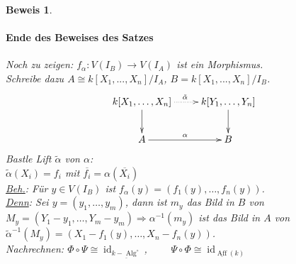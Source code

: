 \documentclass[a4paper,12pt]{report}
\theoremstyle{break}
\theoremstyle{nonumberbreak}
\theoremstyle{nonumberplain}
\newtheorem{Bew}{Beweis}
\begin{document}
\begin{Bew}
\paragraph{Ende des Beweises des Satzes}
Noch zu zeigen: $f_{\alpha}: V(I_B) \rightarrow V(I_A)$ ist ein Morphismus.\\
Schreibe dazu $A\cong k[X_1,...,X_n]/I_A$, $B=k[X_1,...,X_n]/I_B$.
\[
\begin{xy}
\xymatrix{
k[X_1,\dots,X_n]\ar@{.>}[r]^{\tilde{\alpha}}\ar[d]&k[Y_1,\dots,Y_n]\ar[d] \\
A\ar[r]^{\alpha}&B
}
\end{xy}
\]
Bastle Lift $\tilde{\alpha}$ von $\alpha$:\\
$\tilde{\alpha}(X_i)=f_i$ mit $\overline{f_i}=\alpha(\overline{X_i})$\\
\underline{Beh.}: Für $y\in V(I_B)$ ist $f_{\alpha}(y)=(f_1(y),\dots,f_n(y))$.\\
\underline{Denn}: Sei $y=(y_1,\dots,y_m)$, dann ist $m_y$ das Bild in $B$ von $M_y=(Y_1-y_1,\dots,Y_m-y_m)\Rightarrow \alpha^{-1}(m_y)$ ist das Bild in $A$ von $\tilde{\alpha}^{-1}(M_y)= (X_1-f_1(y),\dots,X_n-f_n(y))$.\\
Nachrechnen: $\Phi\circ\Psi\cong\operatorname{id}_{\underline{k-\operatorname{Alg}^{\circ}}}$, ~~~~$\Psi\circ\Phi\cong\operatorname{id}_{\underline{\operatorname{Aff}}(k)}$
\end{Bew}
\end{document}
